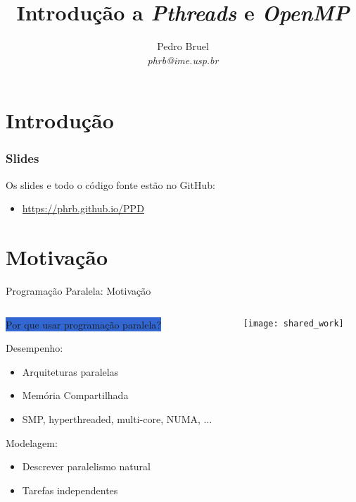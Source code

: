 \documentclass[10pt, compress, aspectratio=169, xcolor={table,usenames,dvipsnames}]{beamer}
\title{Introdução a \textit{Pthreads} e \textit{OpenMP}}
\author{\footnotesize Pedro Bruel \\ {\scriptsize \emph{phrb@ime.usp.br}}}
\date{}
\begin{document}
\maketitle

\section*{Introdução}

\begin{frame}
    \frametitle{Slides}
    Os slides e todo o código fonte estão no \alert{GitHub}:

    \begin{itemize}
        \item \url{https://phrb.github.io/PPD}
    \end{itemize}
\end{frame}

\section{Motivação}

\begin{frame}{Programação Paralela: Motivação}
  \begin{columns}
    \begin{column}{0.5\columnwidth}
      \colorbox{Highlight}{Por que usar \alert{programação paralela}?}

      \vspace{0.8em}

      \alert{Desempenho}:
      \begin{itemize}
      \item Arquiteturas paralelas
      \item Memória Compartilhada
      \item SMP, hyperthreaded, multi-core, NUMA, $\dots$
      \end{itemize}

      \alert{Modelagem}:
      \begin{itemize}
      \item Descrever paralelismo natural
      \item Tarefas independentes
      \end{itemize}
    \end{column}
    \begin{column}{0.5\columnwidth}
      \begin{center}
        \texttt{[image: shared\_work]}
      \end{center}
    \end{column}
  \end{columns}
\end{frame}
\end{document}

